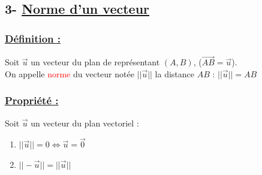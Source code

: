 \documentclass{article}
\begin{document}

\subsection*{3- \underline{\color{red}Norme d'un vecteur}}

\subsubsection*{\underline{\color{red}Définition :}}
Soit $\vec{u}$ un vecteur du plan de représentant $(A, B)$, ($\overrightarrow{AB} = \vec{u}$).\\
On appelle \textcolor{red}{norme} du vecteur notée $||\vec{u}||$ la distance $AB$ :
$ ||\vec{u}|| = AB $

\subsubsection*{\underline{\color{red}Propriété :}}
Soit $\vec{u}$ un vecteur du plan vectoriel :
\begin{enumerate}
    \item[i)] $||\vec{u}|| = 0 \iff \vec{u} = \vec{0}$
    \item[ii)] $||-\vec{u}|| = ||\vec{u}||$
\end{enumerate}
\end{document}
